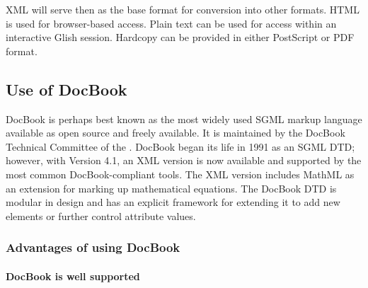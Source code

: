 \noindent XML will serve then as the base format for conversion into
other formats.  HTML is used for browser-based access.  Plain text can
be used for access within an interactive Glish session.  Hardcopy can
be provided in either PostScript or PDF format.  

\subsection{Use of DocBook} 

DocBook is perhaps best known as the most widely used SGML markup
language available as open source and freely available.  It is
maintained by the DocBook Technical Committee of the
.  DocBook
began its life in 1991 as an SGML DTD; however, with Version 4.1, an
XML version is now available and supported by the most common
DocBook-compliant tools.  The XML version includes MathML as an
extension for marking up mathematical equations.  The DocBook DTD is
modular in design and has an explicit framework for extending it to
add new elements or further control attribute values.

\subsubsection{Advantages of using DocBook}

\paragraph{DocBook is well supported}

